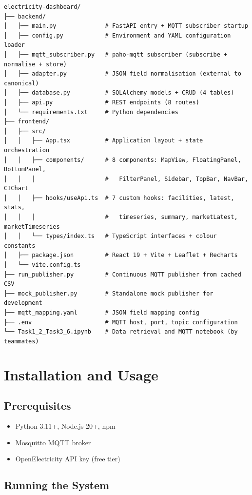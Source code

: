 \documentclass[11pt,a4paper]{article}
\begin{document}
\begin{lstlisting}
electricity-dashboard/
├── backend/
│   ├── main.py              # FastAPI entry + MQTT subscriber startup
│   ├── config.py            # Environment and YAML configuration loader
│   ├── mqtt_subscriber.py   # paho-mqtt subscriber (subscribe + normalise + store)
│   ├── adapter.py           # JSON field normalisation (external to canonical)
│   ├── database.py          # SQLAlchemy models + CRUD (4 tables)
│   ├── api.py               # REST endpoints (8 routes)
│   └── requirements.txt     # Python dependencies
├── frontend/
│   ├── src/
│   │   ├── App.tsx          # Application layout + state orchestration
│   │   ├── components/      # 8 components: MapView, FloatingPanel, BottomPanel,
│   │   │                    #   FilterPanel, Sidebar, TopBar, NavBar, CIChart
│   │   ├── hooks/useApi.ts  # 7 custom hooks: facilities, latest, stats,
│   │   │                    #   timeseries, summary, marketLatest, marketTimeseries
│   │   └── types/index.ts   # TypeScript interfaces + colour constants
│   ├── package.json         # React 19 + Vite + Leaflet + Recharts
│   └── vite.config.ts
├── run_publisher.py         # Continuous MQTT publisher from cached CSV
├── mock_publisher.py        # Standalone mock publisher for development
├── mqtt_mapping.yaml        # JSON field mapping config
├── .env                     # MQTT host, port, topic configuration
└── Task1_2_Task3_6.ipynb    # Data retrieval and MQTT notebook (by teammates)
\end{lstlisting}

\section{Installation and Usage}

\subsection{Prerequisites}
\begin{itemize}
    \item Python 3.11+, Node.js 20+, npm
    \item Mosquitto MQTT broker
    \item OpenElectricity API key (free tier)
\end{itemize}

\subsection{Running the System}
\end{document}
